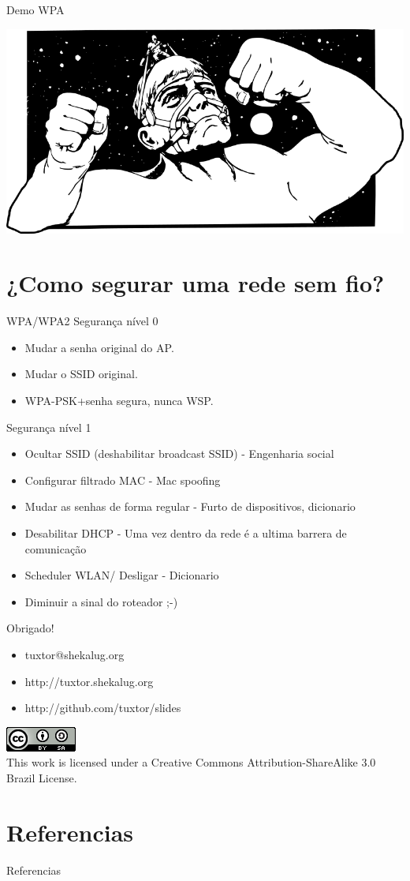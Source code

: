 \documentclass[xcolor=x11names,compress]{beamer}
\renewcommand{\(}{\begin{columns}}
\renewcommand{\)}{\end{columns}}
\newcommand{\<}[1]{\begin{column}{#1}}
\renewcommand{\>}{\end{column}}
\begin{document}
\begin{frame}{Demo WPA}
\begin{center}
\includegraphics[width=0.5\linewidth]{./Pictures/wpa}
\end{center}
\end{frame}


\section[Segurança]{¿Como segurar uma rede sem fio?}
\begin{frame}{WPA/WPA2}
Segurança nível 0
\begin{itemize}
\item Mudar a senha original do AP.
\item Mudar o SSID original.
\item WPA-PSK+senha segura, nunca WSP.
\end{itemize}
\pause
Segurança nível 1
\begin{itemize}
\item Ocultar SSID (deshabilitar broadcast SSID) - Engenharia social
\item Configurar filtrado MAC - Mac spoofing
\item Mudar as senhas de forma regular - Furto de dispositivos, dicionario
\item Desabilitar DHCP - Uma vez dentro da rede é a ultima barrera de comunicação
\item Scheduler WLAN/ Desligar - Dicionario
\item Diminuir a sinal do roteador ;-)
\end{itemize}
\end{frame}

\begin{frame}{Obrigado!}
\begin{itemize}
\item tuxtor@shekalug.org
\item http://tuxtor.shekalug.org
\item http://github.com/tuxtor/slides
\end{itemize}
\begin{center}
\includegraphics[width=0.1\linewidth]{Pictures/cclogo}
\\
This work is licensed under a Creative Commons Attribution-ShareAlike 3.0 Brazil License.
\end{center}
\end{frame}


\section{Referencias}
\begin{frame}[allowframebreaks]{Referencias}
    
    
\end{frame}
\end{document}
